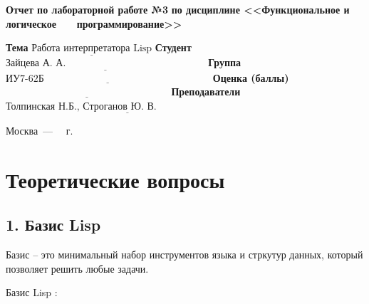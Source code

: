 \documentclass[12pt]{report}
\begin{document}
\begin{titlepage}
		\begin{center}
			\noindent\begin{minipage}{1.1\textwidth}\centering
				\Large\textbf{  Отчет по лабораторной работе №3}\newline
				\textbf{по дисциплине <<Функциональное и логическое}\newline
				\textbf{~~~программирование>>}\newline\newline
			\end{minipage}
		\end{center}
		
		\noindent\textbf{Тема} $\underline{\text{Работа интерпретатора Lisp}}$\newline\newline
		\noindent\textbf{Студент} $\underline{\text{Зайцева А. А.~~~~~~~~~~~~~~~~~~~~~~~~~~~~~~~~~~~~~~~~~~}}$\newline\newline
		\noindent\textbf{Группа} $\underline{\text{ИУ7-62Б~~~~~~~~~~~~~~~~~~~~~~~~~~~~~~~~~~~~~~~~~~~~~~~~~~}}$\newline\newline
		\noindent\textbf{Оценка (баллы)} $\underline{\text{~~~~~~~~~~~~~~~~~~~~~~~~~~~~~~~~~~~~~~~~~~~~~~~~~}}$\newline\newline
		\noindent\textbf{Преподаватели} $\underline{\text{Толпинская Н.Б., Строганов Ю. В.~~~~~~~~~~~~~~~~~~~~~~~~~~~~}}$\newline\newline\newline
		
		\begin{center}
			\vfill
			Москва~---~\the\year
			~г.
		\end{center}
	\end{titlepage}
	
\chapter*{Теоретические вопросы}

\section*{1. Базис Lisp}

Базис -- это минимальный набор инструментов языка и стркутур данных, который позволяет решить любые задачи.


Базис Lisp :
\end{document}
